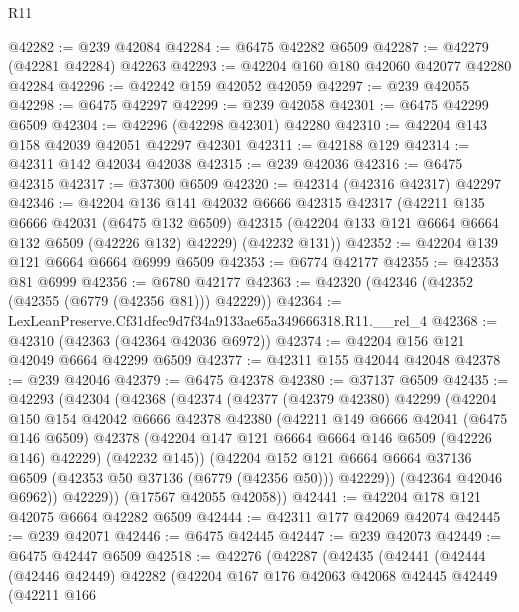 \begin{lexlean}{R11}
\begin{coremodule}
@42282 := @239 @42084
@42284 := @6475 @42282 @6509
@42287 := @42279 (@42281 @42284) @42263
@42293 := @42204 @160 @180 @42060 @42077 @42280 @42284
@42296 := @42242 @159 @42052 @42059
@42297 := @239 @42055
@42298 := @6475 @42297
@42299 := @239 @42058
@42301 := @6475 @42299 @6509
@42304 := @42296 (@42298 @42301) @42280
@42310 := @42204 @143 @158 @42039 @42051 @42297 @42301
@42311 := @42188 @129
@42314 := @42311 @142 @42034 @42038
@42315 := @239 @42036
@42316 := @6475 @42315
@42317 := @37300 @6509
@42320 := @42314 (@42316 @42317) @42297
@42346 := @42204
    @136
    @141
    @42032
    @6666
    @42315
    @42317
    (@42211
      @135
      @6666
      @42031
      (@6475 @132 @6509)
      @42315
      (@42204 @133 @121 @6664 @6664 @132 @6509 (@42226 @132) @42229)
      (@42232 @131))
@42352 := @42204 @139 @121 @6664 @6664 @6999 @6509
@42353 := @6774 @42177
@42355 := @42353 @81 @6999
@42356 := @6780 @42177
@42363 := @42320 (@42346 (@42352 (@42355 (@6779 (@42356 @81))) @42229))
@42364 := LexLeanPreserve.Cf31dfec9d7f34a9133ae65a349666318.R11.__rel_4
@42368 := @42310 (@42363 (@42364 @42036 @6972))
@42374 := @42204 @156 @121 @42049 @6664 @42299 @6509
@42377 := @42311 @155 @42044 @42048
@42378 := @239 @42046
@42379 := @6475 @42378
@42380 := @37137 @6509
@42435 := @42293
    (@42304
      (@42368
        (@42374
          (@42377
            (@42379 @42380)
            @42299
            (@42204
              @150
              @154
              @42042
              @6666
              @42378
              @42380
              (@42211
                @149
                @6666
                @42041
                (@6475 @146 @6509)
                @42378
                (@42204 @147 @121 @6664 @6664 @146 @6509 (@42226 @146) @42229)
                (@42232 @145))
              (@42204
                @152
                @121
                @6664
                @6664
                @37136
                @6509
                (@42353 @50 @37136 (@6779 (@42356 @50)))
                @42229))
            (@42364 @42046 @6962))
          @42229))
      (@17567 @42055 @42058))
@42441 := @42204 @178 @121 @42075 @6664 @42282 @6509
@42444 := @42311 @177 @42069 @42074
@42445 := @239 @42071
@42446 := @6475 @42445
@42447 := @239 @42073
@42449 := @6475 @42447 @6509
@42518 := @42276
    (@42287
      (@42435
        (@42441
          (@42444
            (@42446 @42449)
            @42282
            (@42204
              @167
              @176
              @42063
              @42068
              @42445
              @42449
              (@42211
                @166

\end{coremodule}
\end{lexlean}
